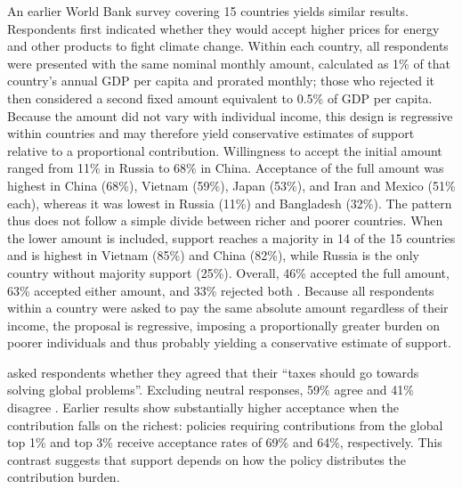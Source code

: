 An earlier World Bank survey covering 15 countries yields similar results. Respondents first indicated whether they would accept higher prices for energy and other products to fight climate change. Within each country, all respondents were presented with the same nominal monthly amount, calculated as 1\% of that country's annual GDP per capita and prorated monthly; those who rejected it then considered a second fixed amount equivalent to 0.5\% of GDP per capita. Because the amount did not vary with individual income, this design is regressive within countries and may therefore yield conservative estimates of support relative to a proportional contribution. Willingness to accept the initial amount ranged from 11\% in Russia to 68\% in China. Acceptance of the full amount was highest in China (68\%), Vietnam (59\%), Japan (53\%), and Iran and Mexico (51\% each), whereas it was lowest in Russia (11\%) and Bangladesh (32\%). The pattern thus does not follow a simple divide between richer and poorer countries. When the lower amount is included, support reaches a majority in 14 of the 15 countries and is highest in Vietnam (85\%) and China (82\%), while Russia is the only country without majority support (25\%). Overall, 46\% accepted the full amount, 63\% accepted either amount, and 33\% rejected both \citep{world_bank_public_2009}. Because all respondents within a country were asked to pay the same absolute amount regardless of their income, the proposal is regressive, imposing a proportionally greater burden on poorer individuals and thus probably yielding a conservative estimate of support.


\citet{fabre_public_2026} asked respondents whether they agreed that their ``taxes should go towards solving global problems''. Excluding neutral responses, 59\% agree and 41\% disagree \citep[Figures S59--S60]{fabre_public_2026}.
Earlier results show substantially higher acceptance when the contribution falls on the richest: policies requiring contributions from the global top 1\% and top 3\% receive acceptance rates of 69\% and 64\%, respectively. This contrast suggests that support depends on how the policy distributes the contribution burden.

